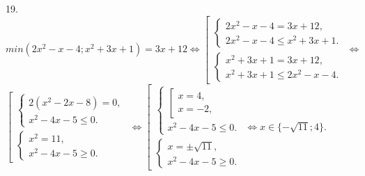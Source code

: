\documentclass[12pt]{article}
\begin{document}
19. $min(2x^2-x-4; x^2+3x+1)=3x+12\Leftrightarrow\left[\begin{array}{l}\begin{cases}2x^2-x-4=3x+12,\\ 2x^2-x-4\leqslant x^2+3x+1.\end{cases}\\ \begin{cases}x^2+3x+1=3x+12,\\ x^2+3x+1\leqslant 2x^2-x-4.\end{cases}\end{array}\right. \Leftrightarrow$\\$\left[\begin{array}{l}\begin{cases}2(x^2-2x-8)=0,\\ x^2-4x-5\leqslant 0.\end{cases}\\ \begin{cases} x^2=11,\\ x^2-4x-5\geqslant 0.\end{cases}\end{array}\right.\Leftrightarrow\left[\begin{array}{l}\begin{cases}
\left[\begin{array}{l} x=4,\\ x=-2,\end{array}\right.\\ x^2-4x-5\leqslant 0.\end{cases}\\ \begin{cases} x=\pm\sqrt{11},\\ x^2-4x-5\geqslant 0.\end{cases}\end{array}\right.\Leftrightarrow x\in\{-\sqrt{11};4\}.$\\
\end{document}

